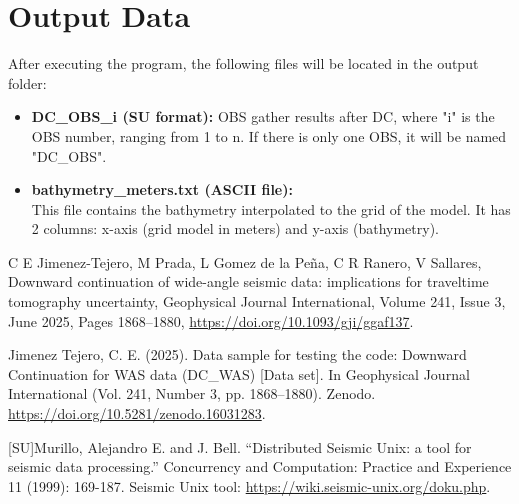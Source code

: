 \documentclass[11pt, oneside]{article}   	%
\begin{document}
\section{Output Data}\label{sec5}

After executing the program, the following files will be located in the output folder:

\begin{itemize}
 
 \item \textbf{DC\_OBS\_i (SU format):} OBS gather results after DC, where "i" is the OBS number, ranging from 1 to n. If there is only one OBS, it will be named "DC\_OBS".
    
 \item \textbf{bathymetry\_meters.txt (ASCII file):}\\
 This file contains the bathymetry interpolated to the grid of the model. It has 2 columns: x-axis (grid model in meters) and y-axis (bathymetry).
 

\end{itemize}



\begin{thebibliography}{999}

 C E Jimenez-Tejero, M Prada, L Gomez de la Peña, C R Ranero, V Sallares, Downward continuation of wide-angle seismic data: implications for traveltime tomography uncertainty, Geophysical Journal International, Volume 241, Issue 3, June 2025, Pages 1868–1880,  \url{https://doi.org/10.1093/gji/ggaf137}.

 Jimenez Tejero, C. E. (2025). Data sample for testing the code: Downward Continuation for WAS data (DC\_WAS) [Data set]. In Geophysical Journal International (Vol. 241, Number 3, pp. 1868–1880). Zenodo.  \url{https://doi.org/10.5281/zenodo.16031283}.

[SU]Murillo, Alejandro E. and J. Bell. “Distributed Seismic Unix: a tool for seismic data processing.” Concurrency and Computation: Practice and Experience 11 (1999): 169-187. Seismic Unix tool: \url{https://wiki.seismic-unix.org/doku.php}.

\end{thebibliography}
\end{document}
